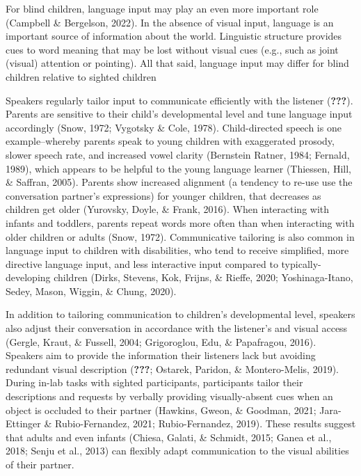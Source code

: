 \documentclass[english,man]{apa6}
\begin{document}
For blind children, language input may play an even more important role (Campbell \& Bergelson, 2022). In the absence of visual input, language is an important source of information about the world. Linguistic structure provides cues to word meaning that may be lost without visual cues (e.g., such as joint (visual) attention or pointing). All that said, language input may differ for blind children relative to sighted children

Speakers regularly tailor input to communicate efficiently with the listener ({\textbf{???}}). Parents are sensitive to their child's developmental level and tune language input accordingly (Snow, 1972; Vygotsky \& Cole, 1978). Child-directed speech is one example--whereby parents speak to young children with exaggerated prosody, slower speech rate, and increased vowel clarity (Bernstein Ratner, 1984; Fernald, 1989), which appears to be helpful to the young language learner (Thiessen, Hill, \& Saffran, 2005). Parents show increased alignment (a tendency to re-use use the conversation partner's expressions) for younger children, that decreases as children get older (Yurovsky, Doyle, \& Frank, 2016). When interacting with infants and toddlers, parents repeat words more often than when interacting with older children or adults (Snow, 1972). Communicative tailoring is also common in language input to children with disabilities, who tend to receive simplified, more directive language input, and less interactive input compared to typically-developing children (Dirks, Stevens, Kok, Frijns, \& Rieffe, 2020; Yoshinaga-Itano, Sedey, Mason, Wiggin, \& Chung, 2020).

In addition to tailoring communication to children's developmental level, speakers also adjust their conversation in accordance with the listener's and visual access (Gergle, Kraut, \& Fussell, 2004; Grigoroglou, Edu, \& Papafragou, 2016). Speakers aim to provide the information their listeners lack but avoiding redundant visual description ({\textbf{???}}; Ostarek, Paridon, \& Montero-Melis, 2019). During in-lab tasks with sighted participants, participants tailor their descriptions and requests by verbally providing visually-absent cues when an object is occluded to their partner (Hawkins, Gweon, \& Goodman, 2021; Jara-Ettinger \& Rubio-Fernandez, 2021; Rubio-Fernandez, 2019). These results suggest that adults and even infants (Chiesa, Galati, \& Schmidt, 2015; Ganea et al., 2018; Senju et al., 2013) can flexibly adapt communication to the visual abilities of their partner.
\end{document}
